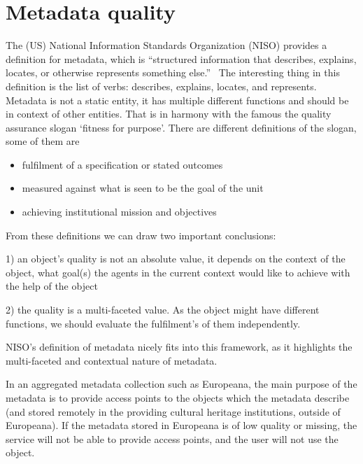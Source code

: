 \section{Metadata quality}


The (US) National Information Standards Organization (NISO) provides a definition for metadata, which is ``structured information that describes, explains, locates, or otherwise represents something else.''~\cite{framework2007} The interesting thing in this definition is the list of verbs: describes, explains, locates, and represents. Metadata is not a static entity, it has multiple different functions and should be in context of other entities. That is in harmony with the famous the quality assurance slogan `fitness for purpose'. There are different definitions of the slogan, some of them are

\begin{itemize}
 \setlength{\parskip}{0pt}
 \setlength{\itemsep}{0pt plus 1pt}
 \item fulfilment of a specification or stated outcomes
 \item measured against what is seen to be the goal of the unit
 \item achieving institutional mission and objectives
\end{itemize}

From these definitions we can draw two important conclusions:

1) an object's quality is not an absolute value, it depends on the context of the object, what goal(s) the agents in the current context would like to achieve with the help of the object

2) the quality is a multi-faceted value. As the object might have different functions, we should evaluate the fulfilment's of them independently.

NISO's definition of metadata nicely fits into this framework, as it highlights the multi-faceted and contextual nature of metadata.

In an aggregated metadata collection such as Europeana, the main purpose of the metadata is to provide access points to the objects which the metadata describe (and stored remotely in the providing cultural heritage institutions, outside of Europeana). If the metadata stored in Europeana is of low quality or missing, the service will not be able to provide access points, and the user will not use the object.

